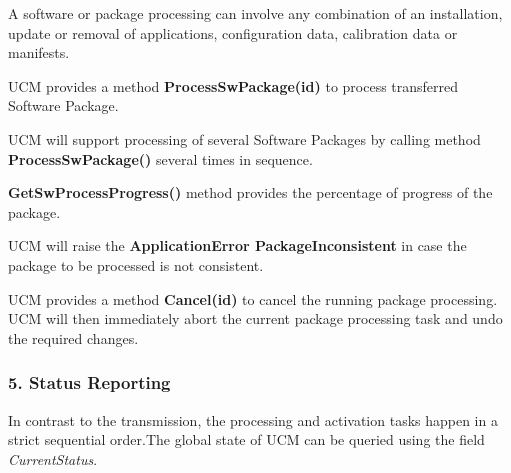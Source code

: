 \begin{DoxyItemize}
\item A software or package processing can involve any combination of an installation, update or removal of applications, configuration data, calibration data or manifests.
\item U\+CM provides a method {\bfseries Process\+Sw\+Package(id)} to process transferred Software Package.
\item U\+CM will support processing of several Software Packages by calling method {\bfseries Process\+Sw\+Package()} several times in sequence.
\item {\bfseries Get\+Sw\+Process\+Progress()} method provides the percentage of progress of the package.
\item U\+CM will raise the {\bfseries Application\+Error Package\+Inconsistent} in case the package to be processed is not consistent.
\item U\+CM provides a method {\bfseries Cancel(id)} to cancel the running package processing. U\+CM will then immediately abort the current package processing task and undo the required changes.
\end{DoxyItemize}

\subsubsection*{5. Status Reporting}

In contrast to the transmission, the processing and activation tasks happen in a strict sequential order.\+The global state of U\+CM can be queried using the field {\itshape Current\+Status}.


